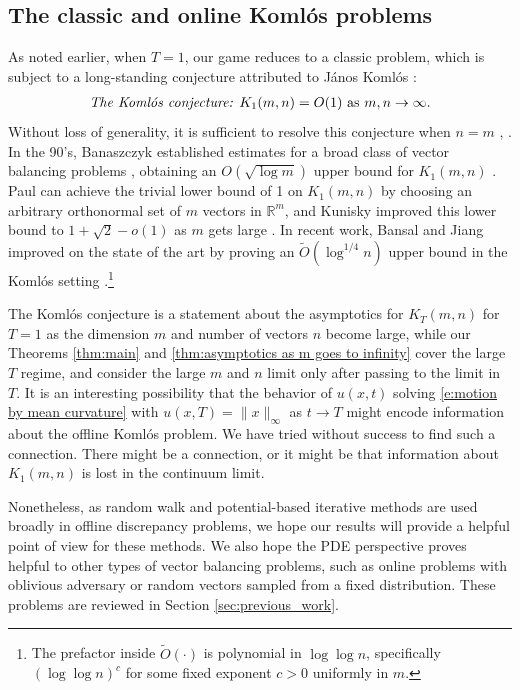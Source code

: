\documentclass[reqno]{amsart}
\numberwithin{equation}{section}
\newcommand{\R}{\mathbb R}
\begin{document}
\subsection{The classic and online Koml\'os problems}  As noted earlier, when $T=1$, our game reduces to a classic  problem, which is subject to a long-standing conjecture attributed to J\'anos Koml\'os \cite {Spe85}: 
\begin{align*}
 \emph{The Koml\'os conjecture: }  K_1(m,n) = O(1) \text{ as }  m,n\to \infty. 
\end{align*}
 Without loss of generality, it is sufficient to resolve this conjecture when $n = m$  \cite{BECK19811},  \cite[Lecture 5]{Spe94}. In the 90's,  Banaszczyk established  estimates for a broad class of vector balancing problems \cite{Banaszczyk1993, Ban98}, obtaining an $O(\sqrt{\log m})$ upper bound for $K_{1}(m,n)$ \cite {Ban98}.  Paul can achieve the trivial lower bound of 1 on $K_{1}(m,n)$ by choosing an arbitrary orthonormal set of $m$ vectors in $\R^m$, and Kunisky  improved this lower bound  to  $1 +\sqrt{2} -o(1)$ as $m$ gets large \cite{Kun23}. In  recent work, Bansal and  Jiang  improved on the state of the art by proving  an $\tilde O(\log ^{1/4} n)$ upper bound in the  Koml\'os setting \cite{BJ2025}.\footnote{The prefactor inside $\tilde O(\cdot)$ is polynomial in $\log\log n$, specifically $(\log\log n)^c$ for some fixed exponent $c>0$ uniformly in $m$.} 

The Koml\'os conjecture is a statement about the asymptotics for $K_{T}(m,n)$ for $T=1$ as the dimension $m$ and number of vectors $n$ become large, while our Theorems \ref{thm:main} and \ref{thm:asymptotics as m goes to infinity}  cover the large $T$ regime, and consider the large $m$ and $n$ limit only after passing to the limit in $T$. It is an interesting possibility that the behavior of $u(x,t)$ solving \eqref{e:motion by mean curvature} with $u(x,T) = \|x\|_\infty$ as $t\to T$ might  encode information about the offline Koml\'os problem. We have tried without success to find such a connection. There might be a connection, or it might be that information about $K_{1}(m,n)$ is lost in the continuum limit.

Nonetheless, as random walk and potential-based iterative methods are used broadly in offline discrepancy problems, we hope  our results will provide a helpful point of view for these methods. We also hope the PDE perspective proves helpful to other types of vector balancing problems, such as online problems with oblivious adversary or random vectors sampled from a fixed distribution. These problems  are reviewed in Section \ref{sec:previous_work}. 
\end{document}
